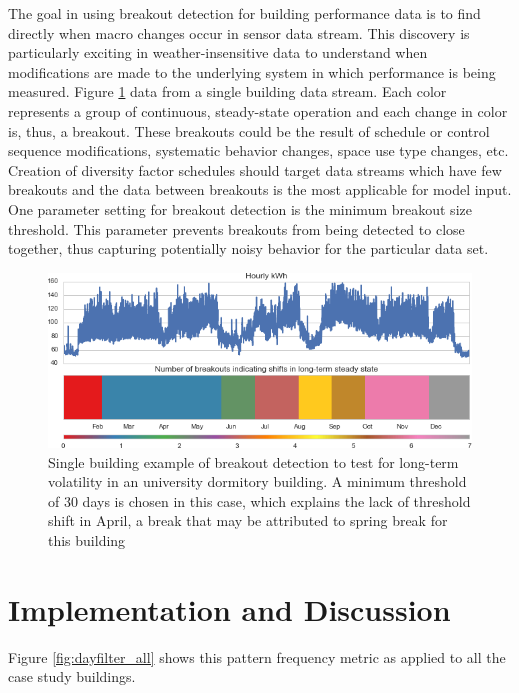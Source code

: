 The goal in using breakout detection for building performance data is to find directly when macro changes occur in sensor data stream. This discovery is particularly exciting in weather-insensitive data to understand when modifications are made to the underlying system in which performance is being measured. Figure \ref{fig:breakout_single} data from a single building data stream. Each color represents a group of continuous, steady-state operation and each change in color is, thus, a breakout. These breakouts could be the result of schedule or control sequence modifications, systematic behavior changes, space use type changes, etc. Creation of diversity factor schedules should target data streams which have few breakouts and the data between breakouts is the most applicable for model input. One parameter setting for breakout detection is the minimum breakout size threshold. This parameter prevents breakouts from being detected to close together, thus capturing potentially noisy behavior for the particular data set.

\begin{figure}[ht!]
\begin{center}
\includegraphics[width=1\columnwidth]{figures/breakout_example/breakout_example}
\caption{Single building example of breakout detection to test for long-term volatility in an university dormitory building. A minimum threshold of 30 days is chosen in this case, which explains the lack of threshold shift in April, a break that may be attributed to spring break for this building
\label{fig:breakout_single}%
}
\end{center}
\end{figure}

\section{Implementation and Discussion}
\label{sec:patternbaseddiscussion}

Figure \ref{fig:dayfilter_all} shows this pattern frequency metric as applied to all the case study buildings.

